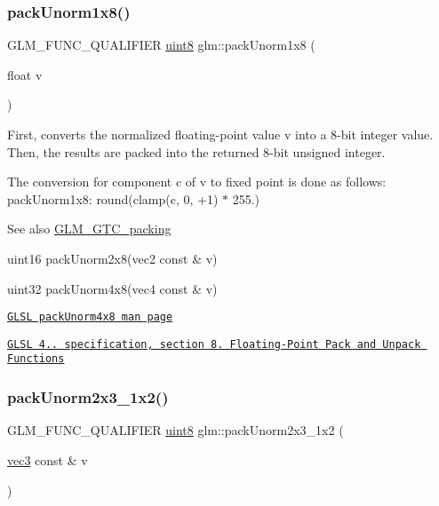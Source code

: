 \subsubsection{\texorpdfstring{pack\+Unorm1x8()}{packUnorm1x8()}}
{\footnotesize\ttfamily G\+L\+M\+\_\+\+F\+U\+N\+C\+\_\+\+Q\+U\+A\+L\+I\+F\+I\+ER \hyperlink{group__gtc__type__precision_ga1a7dcd8aac97cc8020817c94049deff2}{uint8} glm\+::pack\+Unorm1x8 (\begin{DoxyParamCaption}\item[{float}]{v }\end{DoxyParamCaption})}

First, converts the normalized floating-\/point value v into a 8-\/bit integer value. Then, the results are packed into the returned 8-\/bit unsigned integer.

The conversion for component c of v to fixed point is done as follows\+: pack\+Unorm1x8\+: round(clamp(c, 0, +1) $\ast$ 255.)

\begin{DoxySeeAlso}{See also}
\hyperlink{group__gtc__packing}{G\+L\+M\+\_\+\+G\+T\+C\+\_\+packing} 

uint16 pack\+Unorm2x8(vec2 const \& v) 

uint32 pack\+Unorm4x8(vec4 const \& v) 

\href{http://www.opengl.org/sdk/docs/manglsl/xhtml/packUnorm4x8.xml}{\tt G\+L\+SL pack\+Unorm4x8 man page} 

\href{http://www.opengl.org/registry/doc/GLSLangSpec.4.20.8.pdf}{\tt G\+L\+SL 4.. specification, section 8. Floating-\/\+Point Pack and Unpack Functions} 
\end{DoxySeeAlso}
\mbox{\label{group__gtc__packing_ga0acca4eb99c300fe2edeef7ebd8fa08b}} 
\subsubsection{\texorpdfstring{pack\+Unorm2x3\+\_\+1x2()}{packUnorm2x3\_1x2()}}
{\footnotesize\ttfamily G\+L\+M\+\_\+\+F\+U\+N\+C\+\_\+\+Q\+U\+A\+L\+I\+F\+I\+ER \hyperlink{group__gtc__type__precision_ga1a7dcd8aac97cc8020817c94049deff2}{uint8} glm\+::pack\+Unorm2x3\+\_\+1x2 (\begin{DoxyParamCaption}\item[{\hyperlink{group__core__types_ga1c47e8b3386109bc992b6c48e91b0be7}{vec3} const \&}]{v }\end{DoxyParamCaption})}

